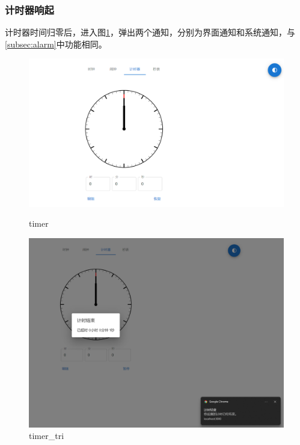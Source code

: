 \documentclass[a4paper,11pt]{article}
\begin{document}
\subsubsection{计时器响起}
计时器时间归零后，进入图\ref{fig:timer_tri}，弹出两个通知，分别为界面通知和系统通知，与 \ref{subsec:alarm}中功能相同。

\begin{figure}[!h]
    \centering
    \begin{minipage}{0.48\textwidth}
        \centering
        \includegraphics[width=\linewidth]{image/timer.png}
        \caption{timer}
            \label{fig:timer}
    \end{minipage}\hfill
    \begin{minipage}{0.48\textwidth}
        \centering
        \includegraphics[width=\linewidth]{image/timer_tri.png}
        \caption{timer\_tri}
        \label{fig:timer_tri}
    \end{minipage}
\end{figure}
\end{document}
